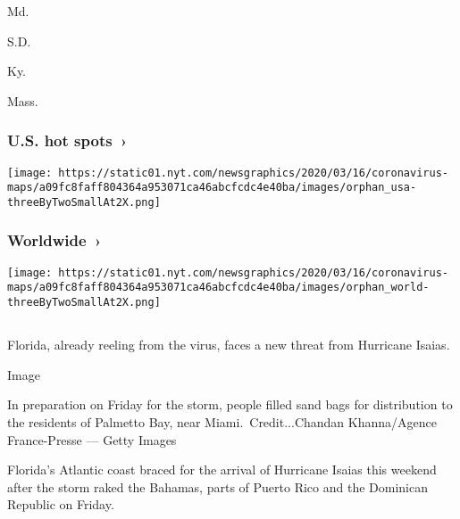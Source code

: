 Md.

\href{https://www.nytimes.com/interactive/2020/us/south-dakota-coronavirus-cases.html}{}

S.D.

\href{https://www.nytimes.com/interactive/2020/us/kentucky-coronavirus-cases.html}{}

Ky.

\href{https://www.nytimes.com/interactive/2020/us/massachusetts-coronavirus-cases.html}{}

Mass.

\href{https://www.nytimes.com/interactive/2020/us/coronavirus-us-cases.html}{}

\hypertarget{us-hot-spots-}{%
\subsubsection{U.S. hot spots~›}\label{us-hot-spots-}}

\texttt{[image: https://static01.nyt.com/newsgraphics/2020/03/16/coronavirus-maps/a09fc8faff804364a953071ca46abcfcdc4e40ba/images/orphan\_usa-threeByTwoSmallAt2X.png]}

\href{https://www.nytimes.com/interactive/2020/world/coronavirus-maps.html}{}

\hypertarget{worldwide-}{%
\subsubsection{Worldwide~›}\label{worldwide-}}

\texttt{[image: https://static01.nyt.com/newsgraphics/2020/03/16/coronavirus-maps/a09fc8faff804364a953071ca46abcfcdc4e40ba/images/orphan\_world-threeByTwoSmallAt2X.png]}

\hypertarget{-3}{%
\subsection{}\label{-3}}

Florida, already reeling from the virus, faces a new threat from
Hurricane Isaias.

Image

In preparation on Friday for the storm, people filled sand bags for
distribution to the residents of Palmetto Bay, near
Miami.~Credit...Chandan Khanna/Agence France-Presse --- Getty Images

Florida's Atlantic coast braced for the arrival of Hurricane Isaias this
weekend after the storm raked the Bahamas, parts of Puerto Rico and the
Dominican Republic on Friday.

